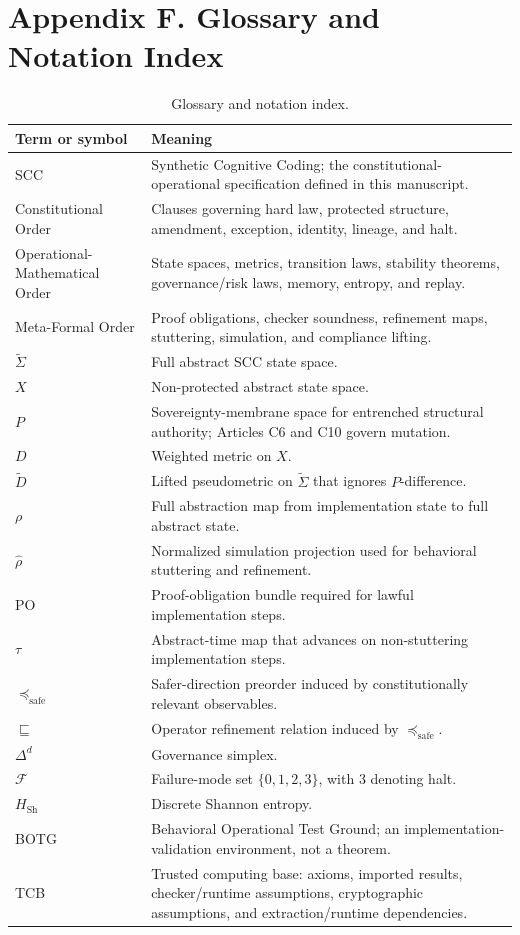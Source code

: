 \documentclass[10pt,oneside]{article}
\theoremstyle{definition}
\theoremstyle{remark}
\newcommand{\Sh}{\mathrm{Sh}}
\newcommand{\PO}{\mathrm{PO}}
\newcommand{\safe}{\mathrm{safe}}
\begin{document}
\section{Appendix F. Glossary and Notation Index}
\begin{longtable}{p{}p{}}
\caption{Glossary and notation index.}\label{tab:glossary}\\
\toprule
Term or symbol & Meaning \\
\midrule
SCC & Synthetic Cognitive Coding; the constitutional-operational specification defined in this manuscript. \\
Constitutional Order & Clauses governing hard law, protected structure, amendment, exception, identity, lineage, and halt. \\
Operational-Mathematical Order & State spaces, metrics, transition laws, stability theorems, governance/risk laws, memory, entropy, and replay. \\
Meta-Formal Order & Proof obligations, checker soundness, refinement maps, stuttering, simulation, and compliance lifting. \\
\(\widetilde\Sigma\) & Full abstract SCC state space. \\
\(X\) & Non-protected abstract state space. \\
\(P\) & Sovereignty-membrane space for entrenched structural authority; Articles C6 and C10 govern mutation. \\
\(D\) & Weighted metric on \(X\). \\
\(\widetilde D\) & Lifted pseudometric on \(\widetilde\Sigma\) that ignores \(P\)-difference. \\
\(\rho\) & Full abstraction map from implementation state to full abstract state. \\
\(\widehat\rho\) & Normalized simulation projection used for behavioral stuttering and refinement. \\
\(\PO\) & Proof-obligation bundle required for lawful implementation steps. \\
\(\tau\) & Abstract-time map that advances on non-stuttering implementation steps. \\
\(\preceq_{\safe}\) & Safer-direction preorder induced by constitutionally relevant observables. \\
\(\sqsubseteq\) & Operator refinement relation induced by \(\preceq_{\safe}\). \\
\(\Delta^d\) & Governance simplex. \\
\(\mathcal F\) & Failure-mode set \(\{0,1,2,3\}\), with \(3\) denoting halt. \\
\(H_{\Sh}\) & Discrete Shannon entropy. \\
BOTG & Behavioral Operational Test Ground; an implementation-validation environment, not a theorem. \\
TCB & Trusted computing base: axioms, imported results, checker/runtime assumptions, cryptographic assumptions, and extraction/runtime dependencies. \\
\bottomrule
\end{longtable}
\end{document}
